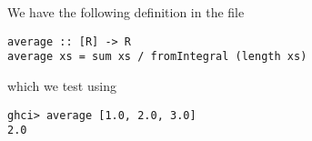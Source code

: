 
We have the following definition in the file 
\begin{verbatim}
average :: [R] -> R
average xs = sum xs / fromIntegral (length xs)
\end{verbatim}
which we test using
\begin{verbatim}
ghci> average [1.0, 2.0, 3.0]
2.0
\end{verbatim}
